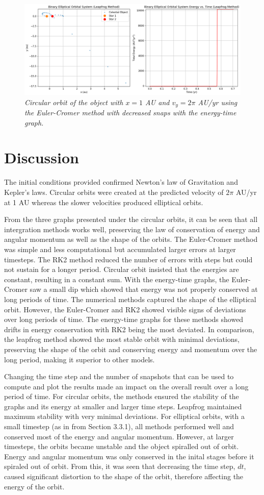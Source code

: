 \documentclass[11 pt, a4paper]{article}
\begin{document}
\begin{figure}[H]
  \includegraphics[width=0.7\linewidth]{binaryleapfrogelliptic.png}
  \centering
  \caption{\textit{Circular orbit of the object with $x = 1$ AU and $v_y = 2\pi$ AU/yr using the Euler-Cromer method with decreased snaps with the energy-time graph.}} 
\end{figure}

\section{Discussion}
The initial conditions provided confirmed Newton's law of Gravitation and Kepler's laws. Circular orbits were created at the predicted velocity of $2\pi$ AU/yr at 1 AU whereas the slower velocities
produced elliptical orbits.

From the three graphs presented under the circular orbits, it can be seen that all intergration methods works well, preserving the law of conservation of energy and angular momentum as well as the shape of the orbits. The Euler-Cromer method was simple and less computational
but accumulated larger errors at larger timesteps. The RK2 method reduced the number of errors with steps but could not sustain for a longer period.
Circular orbit insisted that the energies are constant, resulting in a constant sum. With the energy-time graphs, the Euler-Cromer saw a small dip which showed that energy was not properly conserved at long periods of time.
The numerical methods captured the shape of the elliptical orbit. However, the Euler-Cromer and RK2 showed visible signs of deviations over long periods of time. The energy-time graphs for these methods showed
drifts in energy conservation with RK2 being the most deviated. In comparison, the leapfrog method showed the most stable orbit with minimal deviations, preserving the shape of the orbit and conserving
energy and momentum over the long period, making it superior to other models.

Changing the time step and the number of snapshots that can be used to compute and plot the results made an impact on the overall result over a long period of time. For circular orbits, the methods ensured the stability of the graphs and its energy at smaller and larger time steps. Leapfrog maintained maximum stability
with very minimal deviations. For elliptical orbits, with a small timestep (as in from Section 3.3.1), all methods performed well and conserved most of the energy and angular momentum. However, at larger timesteps, the orbits became unstable and the object spiralled out of orbit. Energy and angular momentum was only 
conserved in the inital stages before it spiraled out of orbit. From this, it was seen that decreasing the time step, $dt$, caused significant distortion to the shape of the orbit, therefore affecting the energy of the orbit. 
\end{document}
